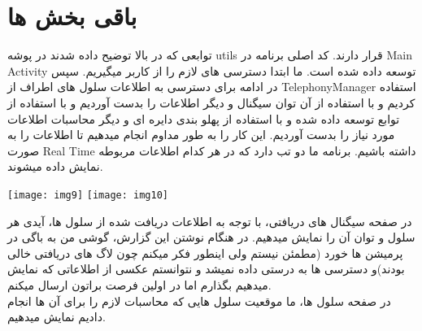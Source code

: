 \documentclass[]{report}
\begin{document}
\section{باقی بخش ها}
توابعی که در بالا توضیح داده شدند در پوشه utils قرار دارند.
کد اصلی برنامه در Main Activity توسعه داده شده است.
ما ابتدا دسترسی های لازم را از کاربر میگیریم.
سپس در ادامه برای دسترسی به اطلاعات سلول های اطراف از TelephonyManager استفاده کردیم و با استفاده از آن توان سیگنال و دیگر اطلاعات را بدست آوردیم و با استفاده از توابع توسعه داده شده و با استفاده از پهلو بندی دایره ای و دیگر محاسبات اطلاعات مورد نیاز را بدست آوردیم. این کار را به طور مداوم انجام میدهیم تا اطلاعات را به صورت Real Time داشته باشیم.
برنامه ما دو تب دارد که در هر کدام اطلاعات مربوطه نمایش داده میشوند.
\begin{center}
	\texttt{[image: img9]}
	\texttt{[image: img10]}
	
	\end{center}
	در صفحه سیگنال های دریافتی، با توجه به اطلاعات دریافت شده از سلول ها، آیدی هر سلول و توان آن را نمایش میدهیم.
	در هنگام نوشتن این گزارش، گوشی من به باگی در پرمیشن ها خورد (مطمئن نیستم ولی اینطور فکر میکنم چون لاگ های دریافتی خالی بودند)و دسترسی ها به درستی داده نمیشد و نتوانستم عکسی از اطلاعاتی که نمایش میدهیم بگذارم اما در اولین فرصت براتون ارسال میکنم.\\
	در صفحه سلول ها، ما موقعیت سلول هایی که محاسبات  لازم را برای آن ها انجام دادیم نمایش میدهیم.
	
\end{document}
